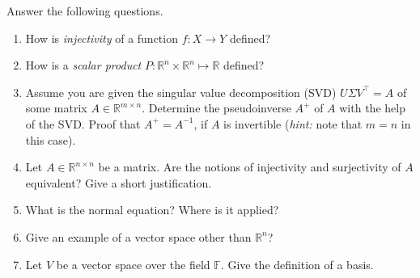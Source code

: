 Answer the following questions.
\begin{enumerate}
	\item How is \textit{injectivity} of a function $f\colon X \to Y$ defined?
	\item How is a \textit{scalar product} $P\colon \mathbb{R}^n \times \mathbb{R}^n \mapsto \mathbb{R}$ defined?
	\item Assume you are given the singular value decomposition (SVD)
	$U \Sigma V^\top = A$ of some matrix $A \in \mathbb{R}^{m \times n}$. Determine the pseudoinverse $A^+$ of $A$ with the help of the SVD. Proof that $A^+ = A^{-1}$, if $A$ is invertible (\textit{hint:} note that $m=n$ in this case).
	
	\item Let $A \in \mathbb{R}^{n \times n}$ be a matrix. Are the notions of
	injectivity and surjectivity of $A$ equivalent? Give a short justification.
	
	\item What is the normal equation? Where is it applied?
	
	\item Give an example of a vector space other than $\mathbb{R}^n$? 
	
	\item Let $V$ be a vector space over the field $\mathbb{F}$. Give the definition of a basis.

\end{enumerate}